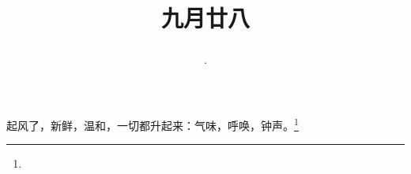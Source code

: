 \title{\date[d=30,m=10,y=2024][year:cn-y,年,month:cn,day:cn,日,·,weekday]·九月廿八 }
起风了，新鲜，温和，一切都升起来：气味，呼唤，钟声。\footnote{ }


